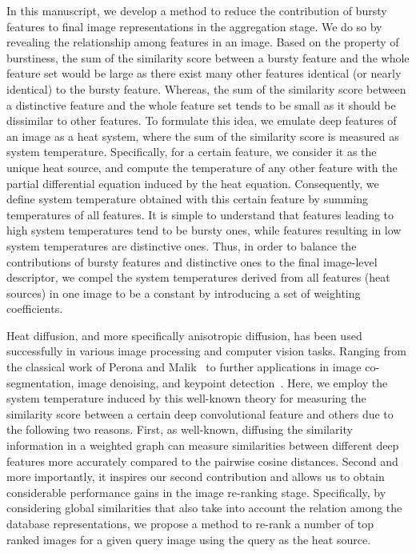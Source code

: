 \documentclass[journal]{IEEEtran}
\begin{document}
In this manuscript, we develop a method to reduce the contribution of bursty features to final image representations in the aggregation stage.
We do so by revealing the relationship among features in an image.
Based on the property of burstiness, the sum of the similarity score between a bursty feature and the whole feature set would be large as there exist many other features identical (or nearly identical) to the bursty feature.
Whereas, the sum of the similarity score between a distinctive feature and the whole feature set tends to be small as it should be  dissimilar to other features.
To formulate this idea, we emulate deep features of an image as a heat system, where the sum of the similarity score is measured as system temperature. Specifically, for a certain feature, we consider it as the unique heat source, and compute the temperature of any other feature with the partial differential equation induced by the heat equation.
Consequently, we define system temperature obtained with this certain feature by summing temperatures of all features.
It is simple to understand that features leading to high system temperatures tend to be bursty ones, while features resulting in low system temperatures are distinctive ones.
Thus, in order to balance the contributions of bursty features and distinctive ones to the final image-level descriptor,
we compel the system temperatures derived from all features (heat sources) in one image to be a constant by introducing a set of weighting coefficients.


Heat diffusion, and more specifically anisotropic diffusion, has been used successfully in various image processing and computer vision tasks. Ranging from the classical work of Perona and Malik~\cite{perona1990scale} to further applications in image co-segmentation, image denoising, and keypoint detection~\cite{zhang2010diffusion,kim2011distributed,karpushin2016keypoint, cho2017geodesic}.
Here, we employ the system temperature induced by this well-known theory for measuring the similarity score between a certain deep convolutional feature and others due to the following two reasons.
First, as well-known, diffusing the similarity information in a weighted graph can measure similarities between different deep features more accurately compared to the pairwise cosine distances.
Second and more importantly, it inspires our second contribution and allows us to obtain considerable performance gains in the image re-ranking stage. Specifically, by considering global similarities that also take into  account the relation among the database representations, we propose a method to re-rank a number of top ranked images for a given query image using the query as the heat source.
\end{document}
